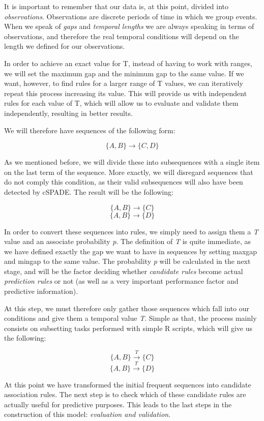 \documentclass[a4paper,12pt]{article}
\begin{document}
It is important to remember that our data is, at this point, divided into \emph{observations}. Observations are discrete periods of time in which we group events. When we speak of \emph{gaps} and \emph{temporal lengths} we are always speaking in terms of observations, and therefore the real temporal conditions will depend on the length we defined for our observations.

In order to achieve an exact value for T, instead of having to work with ranges, we will set the maximum gap and the minimum gap to the same value. If we want, however, to find rules for a larger range of T values, we can iteratively repeat this process increasing its value. This will provide us with independent rules for each value of T, which will allow us to evaluate and validate them independently, resulting in better results. 

We will therefore have sequences of the following form:

$$\{A, B\} \longrightarrow \{C, D\}$$

As we mentioned before, we will divide these into subsequences with a single item on the last term of the sequence. More exactly, we will disregard sequences that do not comply this condition, as their valid subsequences will also have been detected by cSPADE. The result will be the following:

$$\{A, B\} \longrightarrow \{C\}$$
$$\{A, B\} \longrightarrow \{D\}$$

In order to convert these sequences into rules, we simply need to assign them a \emph{T} value and an associate probability \emph{p}. The definition of \emph{T} is quite immediate, as we have defined exactly the gap we want to have in sequences by setting maxgap and mingap to the same value. The probability \emph{p} will be calculated in the next stage, and will be the factor deciding whether \emph{candidate rules} become actual \emph{prediction rules} or not (as well as a very important performance factor and predictive information).

At this step, we must therefore only gather those sequences which fall into our conditions and give them a temporal value \emph{T}. Simple as that, the process mainly consists on subsetting tasks performed with simple R scripts, which will give us the following:

$$\{A, B\} \xrightarrow{T} \{C\}$$
$$\{A, B\} \xrightarrow{T} \{D\}$$

At this point we have transformed the initial frequent sequences into candidate association rules. The next step is to check which of these candidate rules are actually useful for predictive purposes. This leads to the last steps in the construction of this model: \emph{evaluation and validation}.
\end{document}
